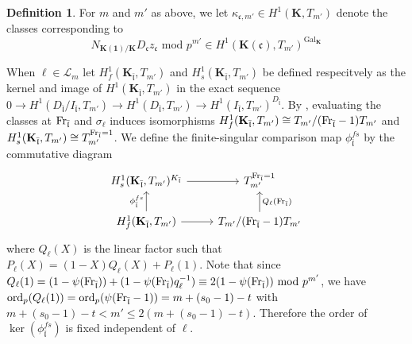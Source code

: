 \documentclass[leqno]{amsart}
\newcommand{\flw}{\bar{\fl}}
\newcommand{\Fr}{\textnormal{Fr}} %
\DeclareMathOperator{\Gal}{Gal}
\newcommand{\ord}{\textnormal{ord}}
\newcommand{\id}{\mathbf{1}}
\newcommand{\K}{{\mathbf{K}}} %
\newcommand{\rk}[1]{\K({#1})} %
\newcommand{\fc}{\mathfrak{c}}
\newcommand{\fl}{\mathfrak{l}}
\theoremstyle{definition}
\newtheorem{defn}[thm]{Definition}
\theoremstyle{remark}
\begin{document}
\begin{defn}
For $m$ and  $m'$ as above, 
we let $\kappa_{\fc,m'}\in H^1(\K,T_{m'})$
denote the classes corresponding to 
\[
	N_{\rk{\id}/\K}D_{\fc}z_{\fc}
	\text{ mod }p^{m'} \in 
	H^1(\rk{\fc}, T_{m'})^{\Gal_\K}
\]
\end{defn}
When $\ell\in \mathcal{L}_m$
let $H^1_f(\K_{\flw},T_{m'})$ and
$H^1_s(\K_{\flw},T_{m'})$ be defined respecitvely
as the kernel and image of $H^1(\K_{\flw},T_{m'})$ 
in the exact sequence 
$0\to H^1(D_{\flw}/I_{\flw},T_{m'})
\to H^1(D_{\flw},T_{m'})
\to H^1(I_{\flw},T_{m'})^{D_{\flw}}$.
By \cite[Lem 1.4.7]{Rubin},
evaluating the classes at
$\Fr_{\flw}$ and $\sigma_\ell$ induces isomorphisms
$H^1_f(\K_{\flw},T_{m'})\cong T_{m'}/(\Fr_{\flw}-1)T_{m'}$
and
$H^1_s(\K_{\flw},T_{m'})\cong T_{m'}^{\Fr_{\flw}=1}$.
We define the finite-singular comparison map
$\phi_{\flw}^{fs}$ by the commutative diagram
\[
	\begin{tikzcd}
		H^1_s(\K_{\flw}, T_{m'})^{K_{\flw}} \arrow[r]&
		T_{m'}^{\Fr_{\flw}=1}\\
		H^1_{f}(\K_{\flw}, T_{m'}) \arrow[r]
		\arrow[u,"\phi_{\flw}^{fs}"]&
		T_{m'}/(\Fr_{\flw}-1)T_{m'}
		\arrow[u,"Q_\ell(\Fr_{\flw})",swap]
	\end{tikzcd}
\]
where $Q_\ell(X)$ is the linear factor  such that 
$P_\ell(X)=(1-X)Q_\ell(X)+P_\ell(1)$.
Note that since
$Q_\ell(1)=
(1-\psi(\Fr_{\flw}))+(1-\psi(\Fr_{\flw})q_\ell^{-1})
\equiv 2(1-\psi(\Fr_{\flw})) \text{ mod }p^{m'}$,
we have $\ord_p(Q_\ell(1))=\ord_p(\psi(\Fr_{\flw}-1))
=m+(s_0-1)-t$ with 
$m+(s_0-1)-t< m'\leq 2(m+(s_0-1)-t)$.
Therefore
the order of $\ker(\phi_{\flw}^{fs})$
is fixed independent of $\ell$.
\end{document}
